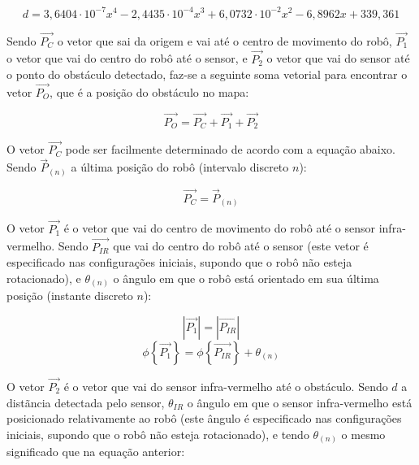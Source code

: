 \begin{equation}
  d = 3,6404 \cdot 10^{-7} x^4 - 2,4435 \cdot 10^{-4} x^3 + 6,0732 \cdot 10^{-2} x^2 - 6,8962 x + 339,361
  \label{eq:IR_dist}
\end{equation}


Sendo $\overrightarrow{P_C}$ o vetor que sai da origem e vai até o centro de movimento do robô, $\overrightarrow{P_1}$ o vetor que vai do centro do robô até o sensor, e $\overrightarrow{P_2}$ o vetor que vai do sensor até o ponto do obstáculo detectado, faz-se a seguinte soma vetorial para encontrar o vetor $\overrightarrow{P_O}$, que é a posição do obstáculo no mapa:

\begin{equation}
  \overrightarrow{P_O} = \overrightarrow{P_C} + \overrightarrow{P_1} + \overrightarrow{P_2}
  \label{eq:IR_vector}
\end{equation}


O vetor $\overrightarrow{P_C}$ pode ser facilmente determinado de acordo com a equação abaixo. Sendo $\overrightarrow{P}_{(n)}$ a última posição do robô (intervalo discreto $n$):

\begin{equation}
  \overrightarrow{P_C} = \overrightarrow{P}_{(n)}
  \label{eq:IR-P_C}
\end{equation}

O vetor $\overrightarrow{P_1}$ é o vetor que vai do centro de movimento do robô até o sensor infra-vermelho. Sendo $\overrightarrow{P_{IR}}$ que vai do centro do robô até o sensor (este vetor é especificado nas configurações iniciais, supondo que o robô não esteja rotacionado), e $\theta_{(n)}$ o ângulo em que o robô está orientado em sua última posição (instante discreto $n$):


\begin{equation}
  |\overrightarrow{P_1}| = |\overrightarrow{P_{IR}}|
  \label{eq:IR-P_1_modulo}
\end{equation}
\begin{equation}
  \phi \left\{ \overrightarrow{P_1} \right\} = \phi \left\{ \overrightarrow{P_{IR}} \right\} + \theta_{(n)}
  \label{eq:IR-P_1_fase}
\end{equation}


O vetor $\overrightarrow{P_2}$ é o vetor que vai do sensor infra-vermelho até o obstáculo. Sendo $d$ a distãncia detectada pelo sensor, $\theta_{IR}$ o ângulo em que o sensor infra-vermelho está posicionado relativamente ao robô (este ângulo é especificado nas configurações iniciais, supondo que o robô não esteja rotacionado), e tendo $\theta_{(n)}$ o mesmo significado que na equação anterior:

